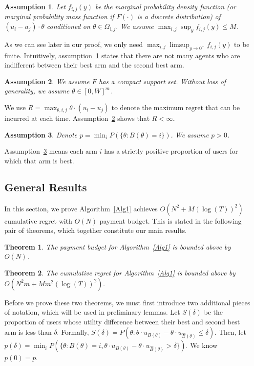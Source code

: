 \documentclass{article}
\newtheorem{theorem}{Theorem}
\newtheorem{assumption}{Assumption}
\begin{document}
\begin{assumption} Let $f_{i,j}(y)$ be the marginal probability density function (or marginal probability mass function if $F(\cdot)$ is a discrete distribution) of $(u_i-u_j)\cdot\theta$ conditioned on $\theta \in \Omega_{i,j}$. We assume $\max_{i,j}\sup_{y}f_{i,j}(y)\leq M$. 
\label{A1}
\end{assumption}

As we can see later in our proof, we only need $\max_{i,j}\limsup_{y\rightarrow 0^{+}}f_{i,j}(y)$ to be finite. Intuitively, assumption~\ref{A1} states that there are not many agents who are indifferent between their best arm and the second best arm. 

\begin{assumption} We assume $F$ has a compact support set. Without loss of generality, we assume $\theta\in [0,W]^m$.
\label{A2}
\end{assumption}

We use $R = \max_{\theta, i,j} \theta \cdot (u_i - u_j)$ to denote the maximum regret that can be incurred at each time.  Assumption~\ref{A2} shows that $R<\infty$.

\begin{assumption}
Denote $p=\min_{i}P(\{\theta: B(\theta)=i\})$. We assume $p>0$.
\label{A3}
\end{assumption}

Assumption~\ref{A3} means each arm $i$ has a strictly positive proportion of users for which that arm is best. 


\subsection{General Results}

In this section, we prove Algorithm~\ref{Alg1} achieves $O(N^2+M(\log(T))^2)$ cumulative regret with $O(N)$ payment budget.  This is stated in the following pair of theorems, which together constitute our main results.

\begin{theorem}
The payment budget for Algorithm~\ref{Alg1} is bounded above by $O(N)$. 
\label{rst:budget}
\end{theorem}


\begin{theorem}
The cumulative regret for Algorithm~\ref{Alg1} is bounded above by $O(N^2 m + M m^2(\log(T))^2)$.
\label{rst:regret}
\end{theorem}

Before we prove these two theorems, we must first introduce two additional pieces of notation, which will be used in preliminary lemmas.  Let $S(\delta)$ be the proportion of users whose utility difference between their best and second best arm is less than $\delta$. Formally, $S(\delta)=P(\theta: \theta \cdot u_{B(\theta)}-\theta\cdot u_{\hat{B}(\theta)}\leq \delta)$. Then, let $p(\delta)=\min_{i}P(\{\theta:B(\theta)=i,\theta\cdot u_{B(\theta)}-\theta\cdot u_{\hat{B}(\theta)}>\delta\})$. We know $p(0)=p$. 
\end{document}
